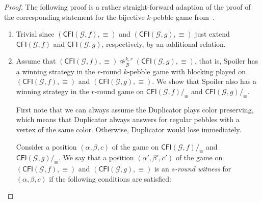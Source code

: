\documentclass[a4paper,english, thm-restate]{lipics-v2021}
\newcommand{\defining}[1]{\emph{#1}}
\newcommand{\comp}{\equiv}
\newcommand{\CFIsym}{\mathsf{CFI}}
\newcommand{\CFI}[1]{\CFIsym(#1)}
\newcommand{\compCFI}[2]{\CFI{#1}/_{#2}}
\newcommand{\precompCFI}[2]{{(\CFI{#1},#2)}}
\newcommand{\graphG}{\mathcal{G}}
\newcommand{\notkbequivr}[2]{\not\simeq_{\mathcal{B}}^{#1,#2}}
\begin{document}
%
\begin{proof}
        The following proof is a rather straight-forward adaption of
        the proof of the corresponding statement for the bijective $k$-pebble game
        from~\cite{DBLP:conf/focs/GroheLNS23}.
        \begin{enumerate}
                \item Trivial since $\precompCFI{\graphG,f}{\comp}$ and  $\precompCFI{\graphG,g}{\comp}$ just extend $\CFI{\graphG,f}$ and $\CFI{\graphG,g}$, respectively, by an additional relation.
                \item 
        
         Assume that $\precompCFI{\graphG,f}{\comp} \notkbequivr{k}{r} \precompCFI{\graphG,g}{\comp}$,
        that is, Spoiler has a winning strategy in the $r$\nobreakdash-round $k$\nobreakdash-pebble game with blocking played on $\precompCFI{\graphG,f}{\comp}$ and $\precompCFI{\graphG,g}{\comp}$.
        We show that Spoiler also has a winning strategy in the $r$\nobreakdash-round game
        on $\compCFI{\graphG,f}{\comp}$ and $\compCFI{\graphG,g}{\comp}$.
        
        First note that we can always assume the Duplicator plays color preserving,
        which means that Duplicator always answers for regular pebbles
         with a vertex of the same color.
        Otherwise, Duplicator would lose immediately.
        
        
        Consider a position $(\alpha,\beta,c)$ of the game on $\compCFI{\graphG,f}{\comp}$ and $\compCFI{\graphG,g}{\comp}$.
        We say that a position $(\alpha',\beta',c')$ of the game on $\precompCFI{\graphG,f}{\comp}$ and $\precompCFI{\graphG,g}{\comp}$ is an \defining{$s$-round witness} for
        $(\alpha,\beta,c)$ if the following conditions are satisfied:
        \begin{enumerate}
        \makeatletter
        \renewcommand{\p@enumii}{}
        \renewcommand{\theenumii}{(\alph{enumii})}
\renewcommand{\labelenumii}{(\alph{enumii})}
        \setlength{\leftskip}{0.5em}
        \makeatother


\end{enumerate}
\end{enumerate}
\end{proof}
\end{document}
